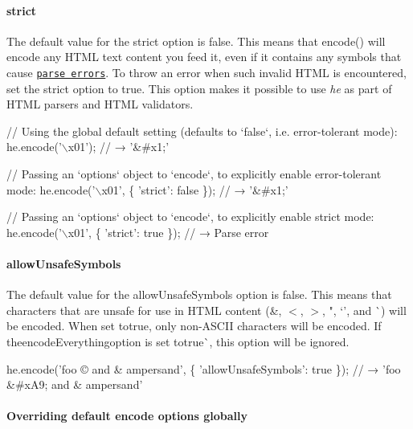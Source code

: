\paragraph*{{\ttfamily strict}}

The default value for the {\ttfamily strict} option is {\ttfamily false}. This means that {\ttfamily encode()} will encode any H\+T\+ML text content you feed it, even if it contains any symbols that cause \href{https://html.spec.whatwg.org/multipage/parsing.html#preprocessing-the-input-stream}{\tt parse errors}. To throw an error when such invalid H\+T\+ML is encountered, set the {\ttfamily strict} option to {\ttfamily true}. This option makes it possible to use {\itshape he} as part of H\+T\+ML parsers and H\+T\+ML validators.


\begin{DoxyCode}
// Using the global default setting (defaults to `false`, i.e. error-tolerant mode):
he.encode('\(\backslash\)x01');
// → '&#x1;'

// Passing an `options` object to `encode`, to explicitly enable error-tolerant mode:
he.encode('\(\backslash\)x01', \{
  'strict': false
\});
// → '&#x1;'

// Passing an `options` object to `encode`, to explicitly enable strict mode:
he.encode('\(\backslash\)x01', \{
  'strict': true
\});
// → Parse error
\end{DoxyCode}


\paragraph*{{\ttfamily allow\+Unsafe\+Symbols}}

The default value for the {\ttfamily allow\+Unsafe\+Symbols} option is {\ttfamily false}. This means that characters that are unsafe for use in H\+T\+ML content ({\ttfamily \&}, {\ttfamily $<$}, {\ttfamily $>$}, {\ttfamily "}, `'{\ttfamily , and} \`{}{\ttfamily ) will be encoded. When set to}true{\ttfamily , only non-\/\+A\+S\+C\+II characters will be encoded. If the}encode\+Everything{\ttfamily option is set to}true\`{}, this option will be ignored.


\begin{DoxyCode}
he.encode('foo © and & ampersand', \{
  'allowUnsafeSymbols': true
\});
// → 'foo &#xA9; and & ampersand'
\end{DoxyCode}


\paragraph*{Overriding default {\ttfamily encode} options globally}

